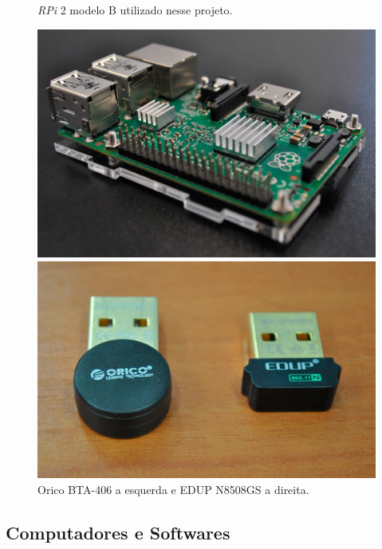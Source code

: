 \begin{figure}[htb]
	\label{teste}
	\centering
 	\begin{minipage}{0.47\textwidth}
		\centering
		\caption{\label{fig:rpi2-utilizado}\textit{RPi} 2 modelo B utilizado nesse projeto.}
		\includegraphics[width=1\textwidth]{img/rpi2.jpg}
	\end{minipage}
	\hfill
	\begin{minipage}{0.45\textwidth}
		\centering
		\caption{\label{fig:adaptadores}Orico BTA-406 a esquerda e EDUP N8508GS a direita.}
		\includegraphics[width=1\textwidth]{img/adaptadores.jpg}
	\end{minipage}
\end{figure}

\subsection{Computadores e Softwares}\label{sec:comp-softwares}

